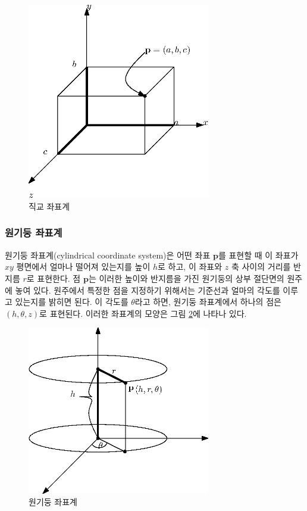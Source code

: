\begin{figure}[h!]
  \centering
    \includegraphics[width=8cm]{Math_transform/CartesianCoord.eps}
    \caption{직교 좌표계}
    \label{fig:transform:CartesianCoord}
\end{figure}

 \subsubsection{원기둥 좌표계}

원기둥 좌표계(cylindrical coordinate system)은 어떤 좌표 $\mathbf p$를 표현할 때 이 좌표가 $xy$ 평면에서 얼마나 떨어져 있는지를 높이 $h$로 하고,
이 좌표와 $z$ 축 사이의 거리를 반지름 $r$로 표현한다. 점 $\mathbf p$는 이러한 높이와 반지름을 가진 원기둥의 상부 절단면의 원주에 놓여 있다.
원주에서 특정한 점을 지정하기 위해서는 기준선과 얼마의 각도를 이루고 있는지를 밝히면 된다. 이 각도를 $\theta$라고 하면, 원기둥 좌표계에서 하나의 점은
$(h, \theta, z)$로 표현된다. 이러한 좌표계의 모양은 그림 \ref{fig:transform:cylindricCoord}에 나타나 있다.

\begin{figure}[h!]
  \centering
    \includegraphics[width=8cm]{Math_transform/cylindricCoord.eps}
    \caption{원기둥 좌표계}
    \label{fig:transform:cylindricCoord}
\end{figure}

